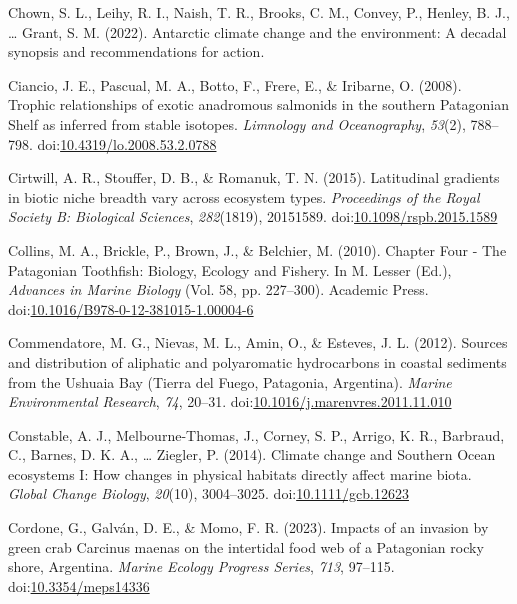 \documentclass[
]{article}
\newlength{\cslhangindent}
\newlength{\cslentryspacingunit} %
\newenvironment{CSLReferences}[2] %
 {%
  \setlength{\parindent}{0pt}
  \ifodd #1
  \let\oldpar\par
  \def\par{\hangindent=\cslhangindent\oldpar}
  \fi
  \setlength{\parskip}{#2\cslentryspacingunit}
 }%
 {}
\begin{document}
\begin{CSLReferences}{1}{0}
\leavevmode{}%
Chown, S. L., Leihy, R. I., Naish, T. R., Brooks, C. M., Convey, P.,
Henley, B. J., \ldots{} Grant, S. M. (2022). Antarctic climate change
and the environment: A decadal synopsis and recommendations for action.

\leavevmode{}%
Ciancio, J. E., Pascual, M. A., Botto, F., Frere, E., \& Iribarne, O.
(2008). Trophic relationships of exotic anadromous salmonids in the
southern {Patagonian Shelf} as inferred from stable isotopes.
\emph{Limnology and Oceanography}, \emph{53}(2), 788--798.
doi:\href{https://doi.org/10.4319/lo.2008.53.2.0788}{10.4319/lo.2008.53.2.0788}

\leavevmode{}%
Cirtwill, A. R., Stouffer, D. B., \& Romanuk, T. N. (2015). Latitudinal
gradients in biotic niche breadth vary across ecosystem types.
\emph{Proceedings of the Royal Society B: Biological Sciences},
\emph{282}(1819), 20151589.
doi:\href{https://doi.org/10.1098/rspb.2015.1589}{10.1098/rspb.2015.1589}

\leavevmode{}%
Collins, M. A., Brickle, P., Brown, J., \& Belchier, M. (2010). Chapter
{Four} - {The Patagonian Toothfish}: {Biology}, {Ecology} and {Fishery}.
In M. Lesser (Ed.), \emph{Advances in {Marine Biology}} (Vol. 58, pp.
227--300). {Academic Press}.
doi:\href{https://doi.org/10.1016/B978-0-12-381015-1.00004-6}{10.1016/B978-0-12-381015-1.00004-6}

\leavevmode{}%
Commendatore, M. G., Nievas, M. L., Amin, O., \& Esteves, J. L. (2012).
Sources and distribution of aliphatic and polyaromatic hydrocarbons in
coastal sediments from the {Ushuaia Bay} ({Tierra} del {Fuego},
{Patagonia}, {Argentina}). \emph{Marine Environmental Research},
\emph{74}, 20--31.
doi:\href{https://doi.org/10.1016/j.marenvres.2011.11.010}{10.1016/j.marenvres.2011.11.010}

\leavevmode{}%
Constable, A. J., Melbourne-Thomas, J., Corney, S. P., Arrigo, K. R.,
Barbraud, C., Barnes, D. K. A., \ldots{} Ziegler, P. (2014). Climate
change and {Southern Ocean} ecosystems {I}: How changes in physical
habitats directly affect marine biota. \emph{Global Change Biology},
\emph{20}(10), 3004--3025.
doi:\href{https://doi.org/10.1111/gcb.12623}{10.1111/gcb.12623}

\leavevmode{}%
Cordone, G., Galván, D. E., \& Momo, F. R. (2023). Impacts of an
invasion by green crab {Carcinus} maenas on the intertidal food web of a
{Patagonian} rocky shore, {Argentina}. \emph{Marine Ecology Progress
Series}, \emph{713}, 97--115.
doi:\href{https://doi.org/10.3354/meps14336}{10.3354/meps14336}


\end{CSLReferences}
\end{document}
